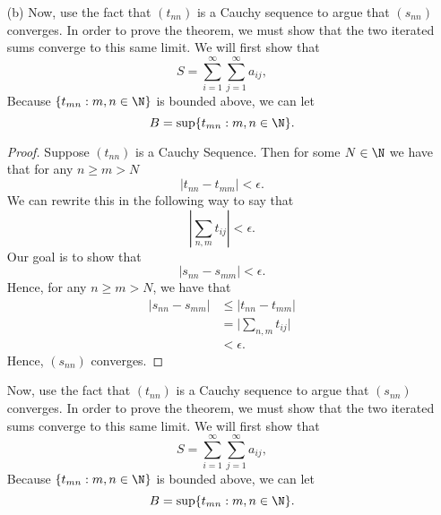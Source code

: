 \begin{enumerate}
        \begin{proof}
            Our goal is to show that \( (t_{nn}) \) is converges to \( L \). That is, our goal is to show that \( (t_{nn}) \) is bounded and monotone. We know that \( (t_{nn}) \) is monotone since all \( t_{nn} \) are non-negative terms and that \( \sum_{ n,m }^{ \infty  } | a_{ij} |  = L  \) where \( L \geq 0 \). To show that \( (t_{nn}) \) is bounded note that 
            \[ t_{mn} = \sum_{ i=1 }^{ m } \sum_{ j=1 }^{ n } | a_{ij} | \leq \sum_{ i=1 }^{ m } \sum_{ j=1 }^{ \infty  } | a_{ij} | \leq \sum_{ i=1 }^{ m } b_i \leq L. \]
            Hence, \( (t_{nn}) \) is a bounded sequence. By the Monotone Convergence Theorem, \( (t_{nn}) \) converges.
        \end{proof}
    \item[(b)] Now, use the fact that \( (t_{nn})\) is a Cauchy sequence to argue that \( (s_{nn})\) converges. In order to prove the theorem, we must show that the two iterated sums converge to this same limit. We will first show that 
        \[ S = \sum_{ i=1 }^{ \infty  } \sum_{ j=1 }^{ \infty  } a_{ij}, \] 
        Because \( \{ t_{mn} : m,n \in \N  \} \) is bounded above, we can let 
        \[ B = \sup \{ t_{mn}: m,n \in \N  \}.\] 
        \begin{proof}
        Suppose \( (t_{nn}) \) is a Cauchy Sequence. Then for some \( N \in \N \) we have that for any \( n \geq m > N  \)
        \[  | t_{nn} - t_{mm} | < \epsilon.  \]
        We can rewrite this in the following way to say that 
        \[  | \sum_{ n,m } t_{ij} | < \epsilon.    \]
        Our goal is to show that 
        \[  | s_{nn} - s_{mm} | < \epsilon.   \]
        Hence, for any \( n \geq  m > N  \), we have that 
        \begin{align*}
            | s_{nn} - s_{mm } | &\leq | t_{nn} - t_{m m }|  \\
                                 &= \Big| \sum_{ n,m } t_{ij} \Big|  \\
                                 &< \epsilon.
        \end{align*}
        Hence, \( (s_{nn}) \) converges.

        \end{proof}

    Now, use the fact that \( (t_{nn})\) is a Cauchy sequence to argue that \( (s_{nn})\) converges. In order to prove the theorem, we must show that the two iterated sums converge to this same limit. We will first show that 
        \[ S = \sum_{ i=1 }^{ \infty  } \sum_{ j=1 }^{ \infty  } a_{ij}, \] 
        Because \( \{ t_{mn} : m,n \in \N  \} \) is bounded above, we can let 
        \[ B = \sup \{ t_{mn}: m,n \in \N  \}.\] 

\end{enumerate}
